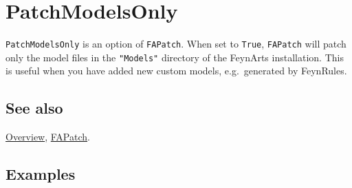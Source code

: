 \documentclass[../FeynCalcManual.tex]{subfiles}
\begin{document}
\hypertarget{patchmodelsonly}{%
\section{PatchModelsOnly}\label{patchmodelsonly}}

\texttt{PatchModelsOnly} is an option of \texttt{FAPatch}. When set to
\texttt{True}, \texttt{FAPatch} will patch only the model files in the
\texttt{"Models"} directory of the FeynArts installation. This is useful
when you have added new custom models, e.g.~generated by FeynRules.

\subsection{See also}

\hyperlink{toc}{Overview}, \hyperlink{fapatch}{FAPatch}.

\subsection{Examples}
\end{document}
